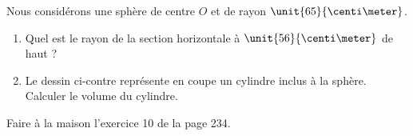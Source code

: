 
\begin{exercice}\label{exosmath-0094}

\begin{wrapfigure}{r}{0.2\textwidth}
    \centering
    \vspace{-0.9cm}

\end{wrapfigure}

    Nous considérons une sphère de centre \( O\) et de rayon \( \unit{65}{\centi\meter}\).
        \begin{enumerate}
            \item
                Quel est le rayon de la section horizontale à \( \unit{56}{\centi\meter}\) de haut ?
            \item
                Le dessin ci-contre représente en coupe un cylindre inclus à la sphère. Calculer le volume du cylindre.
        \end{enumerate}

        Faire à la maison l'exercice 10 de la page 234.

\end{exercice}
